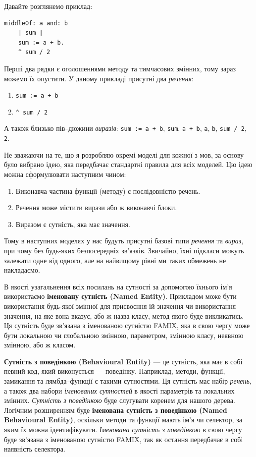 \documentclass[12pt,a4paper]{article}
\begin{document}
Давайте розглянемо приклад:
\begin{lstlisting}[language=Smalltalk]
middleOf: a and: b
    | sum |
    sum := a + b.
    ^ sum / 2
\end{lstlisting}
Перші два рядки є оголошеннями методу та тимчасових змінних, тому зараз можемо їх опустити. У даному прикладі присутні два \emph{речення}:
\begin{enumerate}
	\item \lstinline$sum := a + b$
	\item \lstinline$^ sum / 2$
\end{enumerate}
А також близько пів--дюжини \emph{виразів}: \lstinline$sum := a + b$, \lstinline$sum$, \lstinline$a + b$, \lstinline$a$, \lstinline$b$, \lstinline$sum / 2$, \lstinline$2$.

Не зважаючи на те, що я розробляю окремі моделі для кожної з мов, за основу було вибрано ідею, яка передбачає стандартні правила для всіх моделей. Цю ідею можна сформулювати наступним чином:
\begin{enumerate}
  \item Виконавча частина функції (методу) є послідовністю речень.
  \item Речення може містити вирази або ж виконавчі блоки.
  \item Виразом є сутність, яка має значення.
\end{enumerate}
Тому в наступних моделях у нас будуть присутні базові типи \emph{речення} та \emph{вираз}, при чому без будь-яких безпосередніх зв'язків. Звичайно, їхні підкласи можуть залежати одне від одного, але на найвищому рівні ми таких обмежень не накладаємо.

В якості узагальнення всіх посилань на сутності за допомогою їхнього ім'я використаємо \textbf{іменовану сутність (Named Entity)}. Прикладом може бути використання будь-якої змінної для присвоєння їй значення чи використання значення, на яке вона вказує, або ж назва класу, метод якого буде викликатись. Ця сутність буде зв'язана з іменованою сутністю FAMIX, яка в свою чергу може бути локальною чи глобальною змінною, параметром, змінною класу, неявною змінною, або ж класом.

\textbf{Сутність з поведінкою (Behavioural Entity)} --- це сутність, яка має в собі певний код, який виконується --- поведінку. Наприклад, методи, функції, замикання та лямбда--функції є такими сутностями. Ця сутність має набір \emph{речень}, а також два набори \emph{іменованих сутностей} в якості параметрів та локальних змінних. \emph{Сутність з поведінкою} буде слугувати коренем для нашого дерева. Логічним розширенням буде \textbf{іменована сутність з поведінкою (Named Behavioural Entity)}, оскільки методи та функції мають ім'я чи селектор, за яким їх можна ідентифікувати. \emph{Іменована сутність з поведінкою} в свою чергу буде зв'язана з іменованою сутністю FAMIX, так як остання передбачає в собі наявність селектора.
\end{document}
